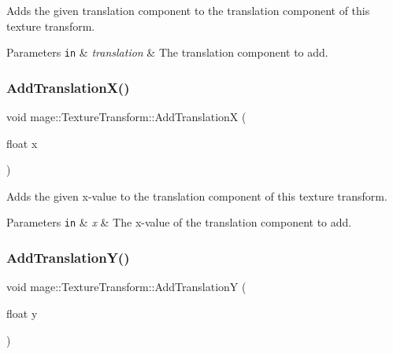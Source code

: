 Adds the given translation component to the translation component of this texture transform.


\begin{DoxyParams}[1]{Parameters}
\mbox{\tt in}  & {\em translation} & The translation component to add. \\
\hline
\end{DoxyParams}
\hypertarget{structmage_1_1_texture_transform_abf4622287ef1cec5dcc4cfd5da03f5ec}{}\label{structmage_1_1_texture_transform_abf4622287ef1cec5dcc4cfd5da03f5ec} 
\subsubsection{\texorpdfstring{Add\+Translation\+X()}{AddTranslationX()}}
{\footnotesize\ttfamily void mage\+::\+Texture\+Transform\+::\+Add\+TranslationX (\begin{DoxyParamCaption}\item[{float}]{x }\end{DoxyParamCaption})\hspace{0.3cm}{\ttfamily [noexcept]}}

Adds the given x-\/value to the translation component of this texture transform.


\begin{DoxyParams}[1]{Parameters}
\mbox{\tt in}  & {\em x} & The x-\/value of the translation component to add. \\
\hline
\end{DoxyParams}
\hypertarget{structmage_1_1_texture_transform_a53962a5137be3e0c9e3d9d74f2f6e6ee}{}\label{structmage_1_1_texture_transform_a53962a5137be3e0c9e3d9d74f2f6e6ee} 
\subsubsection{\texorpdfstring{Add\+Translation\+Y()}{AddTranslationY()}}
{\footnotesize\ttfamily void mage\+::\+Texture\+Transform\+::\+Add\+TranslationY (\begin{DoxyParamCaption}\item[{float}]{y }\end{DoxyParamCaption})\hspace{0.3cm}{\ttfamily [noexcept]}}


